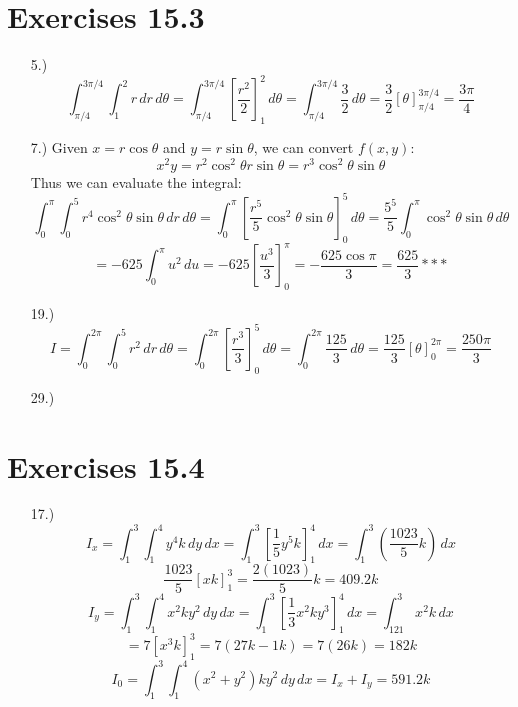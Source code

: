 \documentclass[12pt]{article}
\newcommand{\bracks}[1]{\left[#1\right]}
\newcommand{\parns}[1]{\left(#1\right)}
\begin{document}
\section*{Exercises 15.3}
\begin{itemize}
    \item [5.)] \[\int^{3\pi/4}_{\pi/4}\int^2_1r\,dr\,d\theta=\int^{3\pi/4}_{\pi/4}\bracks{\frac{r^2}{2}}^2_1\,d\theta=\int^{3\pi/4}_{\pi/4}\frac{3}{2}\,d\theta=\frac{3}{2}\bracks{\theta}^{3\pi/4}_{\pi/4}=\frac{3\pi}{4}\]

    \item [7.)] Given $x=r\cos\theta$ and $y=r\sin\theta$, we can convert $f(x,y)$:
    \[x^2y=r^2\cos^2\theta r\sin\theta=r^3\cos^2\theta\sin\theta\]
    Thus we can evaluate the integral:
    \[\int^\pi_0\int^5_0 r^4\cos^2\theta\sin\theta\,dr\,d\theta=\int^\pi_0\bracks{\frac{r^5}{5}\cos^2\theta\sin\theta}^5_0\,d\theta=\frac{5^5}{5}\int^\pi_0\cos^2\theta\sin\theta\,d\theta\]
    \[=-625\int^\pi_0u^2\,du=-625\bracks{\frac{u^3}{3}}^\pi_0=-\frac{625\cos\pi}{3}=\frac{625}{3}***\]

    \item [19.)] \[I=\int^{2\pi}_0\int^5_0r^2\,dr\,d\theta=\int^{2\pi}_0\bracks{\frac{r^3}{3}}^5_0\,d\theta=\int^{2\pi}_0\frac{125}{3}\,d\theta=\frac{125}{3}\bracks{\theta}^{2\pi}_0=\frac{250\pi}{3}\]

    \item [29.)]

\end{itemize}
\section*{Exercises 15.4}
\begin{itemize}
    \item [17.)] \[I_x=\int^3_1\int^4_1y^4k\,dy\,dx=\int^3_1\bracks{\frac{1}{5}y^5k}^4_1\,dx=\int^3_1\parns{\frac{1023}{5}k}\,dx\]
    \[\frac{1023}{5}\bracks{xk}^3_1=\frac{2(1023)}{5}k=409.2k\]
    \[I_y=\int^3_1\int^4_1x^2ky^2\,dy\,dx=\int^3_1\bracks{\frac{1}{3}x^2ky^3}^4_1\,dx=\int^3_121x^2k\,dx\]
    \[=7\bracks{x^3k}^3_1=7(27k-1k)=7(26k)=182k\]
    \[I_0=\int^3_1\int^4_1(x^2+y^2)ky^2\,dy\,dx=I_x+I_y=591.2k\]

\end{itemize}
\end{document}
